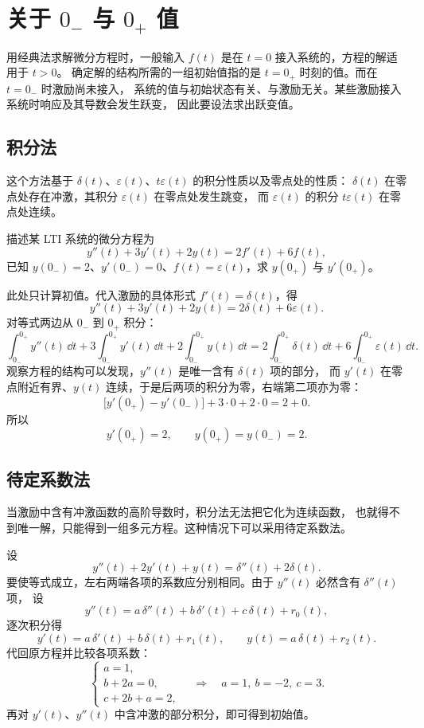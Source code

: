 \section{关于 $0_{-}$ 与 $0_{+}$ 值}

用经典法求解微分方程时，一般输入 $f(t)$ 是在 $t=0$ 接入系统的，方程的解适用于 $t>0$。
确定解的结构所需的一组初始值指的是 $t=0_{+}$ 时刻的值。而在 $t=0_{-}$ 时激励尚未接入，
系统的值与初始状态有关、与激励无关。某些激励接入系统时响应及其导数会发生跃变，
因此要设法求出跃变值。

\subsection{积分法}

这个方法基于 $\delta(t)$、$\varepsilon(t)$、$t\varepsilon(t)$ 的积分性质以及零点处的性质：
$\delta(t)$ 在零点处存在冲激，其积分 $\varepsilon(t)$ 在零点处发生跳变，
而 $\varepsilon(t)$ 的积分 $t\varepsilon(t)$ 在零点处连续。

\begin{note}
\quad 描述某 LTI 系统的微分方程为
\[
    y''(t)+3y'(t)+2y(t)=2f'(t)+6f(t),
\]
已知 $y(0_{-})=2$、$y'(0_{-})=0$、$f(t)=\varepsilon(t)$，求 $y(0_{+})$ 与 $y'(0_{+})$。

\quad 此处只计算初值。代入激励的具体形式 $f'(t)=\delta(t)$，得
\[
    y''(t)+3y'(t)+2y(t)=2\delta(t)+6\varepsilon(t).
\]
对等式两边从 $0_{-}$ 到 $0_{+}$ 积分：
\[
    \int_{0_{-}}^{0_{+}}y''(t)\,\dd t
    +3\int_{0_{-}}^{0_{+}}y'(t)\,\dd t
    +2\int_{0_{-}}^{0_{+}}y(t)\,\dd t
    =2\int_{0_{-}}^{0_{+}}\delta(t)\,\dd t
    +6\int_{0_{-}}^{0_{+}}\varepsilon(t)\,\dd t .
\]
观察方程的结构可以发现，$y''(t)$ 是唯一含有 $\delta(t)$ 项的部分，
而 $y'(t)$ 在零点附近有界、$y(t)$ 连续，于是后两项的积分为零，右端第二项亦为零：
\[
    \bigl[y'(0_{+})-y'(0_{-})\bigr]+3\cdot 0+2\cdot 0=2+0 .
\]
所以
\[
    y'(0_{+})=2,\qquad y(0_{+})=y(0_{-})=2 .
\]
\end{note}

\subsection{待定系数法}

当激励中含有冲激函数的高阶导数时，积分法无法把它化为连续函数，
也就得不到唯一解，只能得到一组多元方程。这种情况下可以采用待定系数法。

\begin{note}
\quad 设
\[
    y''(t)+2y'(t)+y(t)=\delta''(t)+2\delta(t).
\]
要使等式成立，左右两端各项的系数应分别相同。由于 $y''(t)$ 必然含有 $\delta''(t)$ 项，
设
\[
    y''(t)=a\,\delta''(t)+b\,\delta'(t)+c\,\delta(t)+r_0(t),
\]
逐次积分得
\[
    y'(t)=a\,\delta'(t)+b\,\delta(t)+r_1(t),
    \qquad
    y(t)=a\,\delta(t)+r_2(t).
\]
代回原方程并比较各项系数：
\[
    \begin{cases}
        a=1,\\
        b+2a=0,\\
        c+2b+a=2,
    \end{cases}
    \quad\Longrightarrow\quad
    a=1,\ b=-2,\ c=3 .
\]
再对 $y'(t)$、$y''(t)$ 中含冲激的部分积分，即可得到初始值。
\end{note}

